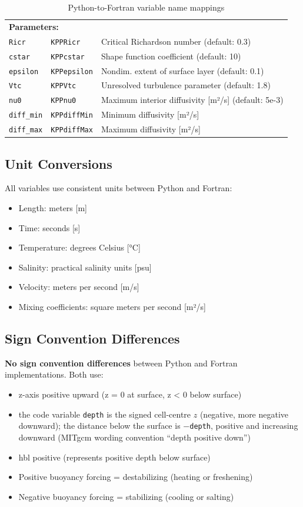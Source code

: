 \documentclass[11pt]{article}
\begin{document}
\begin{table}[h]
\begin{tabular}{llp{4.5cm}}
\midrule
\multicolumn{3}{l}{\textbf{Parameters:}} \\
\verb|Ricr| & \verb|KPPRicr| & Critical Richardson number (default: 0.3) \\
\verb|cstar| & \verb|KPPcstar| & Shape function coefficient (default: 10) \\
\verb|epsilon| & \verb|KPPepsilon| & Nondim. extent of surface layer (default: 0.1) \\
\verb|Vtc| & \verb|KPPVtc| & Unresolved turbulence parameter (default: 1.8) \\
\verb|nu0| & \verb|KPPnu0| & Maximum interior diffusivity [m²/s] (default: 5e-3) \\
\verb|diff_min| & \verb|KPPdiffMin| & Minimum diffusivity [m²/s] \\
\verb|diff_max| & \verb|KPPdiffMax| & Maximum diffusivity [m²/s] \\
\bottomrule
\end{tabular}
\caption{Python-to-Fortran variable name mappings}
\end{table}

\subsection{Unit Conversions}

All variables use consistent units between Python and Fortran:
\begin{itemize}
    \item Length: meters [m]
    \item Time: seconds [s]
    \item Temperature: degrees Celsius [°C]
    \item Salinity: practical salinity units [psu]
    \item Velocity: meters per second [m/s]
    \item Mixing coefficients: square meters per second [m²/s]
\end{itemize}

\subsection{Sign Convention Differences}

\textbf{No sign convention differences} between Python and Fortran implementations. Both use:
\begin{itemize}
    \item z-axis positive upward (z = 0 at surface, z < 0 below surface)
    \item the code variable \verb|depth| is the signed cell-centre $z$ (negative, more negative downward); the distance below the surface is $-$\verb|depth|, positive and increasing downward (MITgcm wording convention ``depth positive down'')
    \item hbl positive (represents positive depth below surface)
    \item Positive buoyancy forcing = destabilizing (heating or freshening)
    \item Negative buoyancy forcing = stabilizing (cooling or salting)
\end{itemize}
\end{document}

